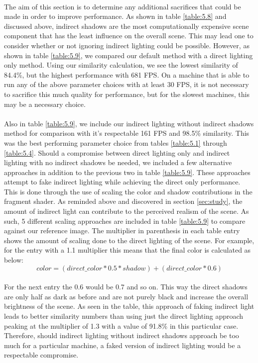 \paragraph{}
The aim of this section is to determine any additional sacrifices that could be made in order to improve performance.  As shown in table \ref{table:5.8} and discussed above, indirect shadows are the most computationally expensive scene component that has the least influence on the overall scene.  This may lead one to consider whether or not ignoring indirect lighting could be possible.  However, as shown in table \ref{table:5.9}, we compared our default method with a direct lighting only method.  Using our similarity calculation, we see the lowest similarity of 84.4\%, but the highest performance with 681 FPS.  On a machine that is able to run any of the above parameter choices with at least 30 FPS, it is not necessary to sacrifice this much quality for performance, but for the slowest machines, this may be a necessary choice.

\paragraph{}
Also in table \ref{table:5.9}, we include our indirect lighting without indirect shadows method for comparison with it's respectable 161 FPS and 98.5\% similarity.  This was the best performing parameter choice from tables \ref{table:5.1} through \ref{table:5.4}.  Should a compromise between direct lighting only and indirect lighting with no indirect shadows be needed, we included a few alternative approaches in addition to the previous two in table \ref{table:5.9}.  These approaches attempt to fake indirect lighting while achieving the direct only performance.  This is done through the use of scaling the color and shadow contributions in the fragment shader.  As reminded above and discovered in section \ref{sec:study}, the amount of indirect light can contribute to the perceived realism of the scene.  As such, 5 different scaling approaches are included in table \ref{table:5.9} to compare against our reference image.  The multiplier in parenthesis in each table entry shows the amount of scaling done to the direct lighting of the scene.  For example, for the entry with a 1.1 multiplier this means that the final color is calculated as below:
\begin{equation}
color = (direct\_color*0.5*shadow)+(direct\_color*0.6)
\end{equation}

\paragraph{}
For the next entry the 0.6 would be 0.7 and so on.  This way the direct shadows are only half as dark as before and are not purely black and increase the overall brightness of the scene.  As seen in the table, this approach of faking indirect light leads to better similarity numbers than using just the direct lighting approach peaking at the multiplier of 1.3 with a value of 91.8\% in this particular case.  Therefore, should indirect lighting without indirect shadows approach be too much for a particular machine, a faked version of indirect lighting would be a respectable compromise.

